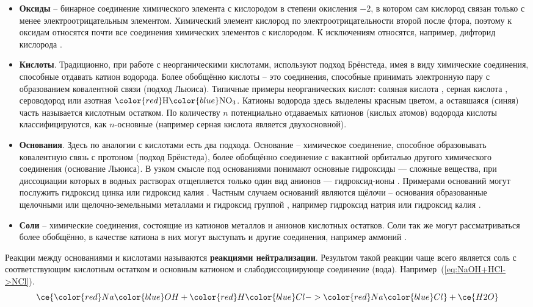 \begin{itemize}
    \item \textbf{Оксиды} --  бинарное соединение химического элемента с кислородом в степени окисления $-2$, в котором сам кислород связан только с менее электроотрицательным элементом. Химический элемент кислород по электроотрицательности второй после фтора, поэтому к оксидам относятся почти все соединения химических элементов с кислородом. К исключениям относятся, например, дифторид кислорода .
    \item \textbf{Кислоты}. Традиционно, при работе с неорганическими кислотами, используют подход Брёнстеда, имея в виду химические соединения, способные отдавать катион водорода. Более обобщённо кислоты -- это соединения, способные принимать электронную пару с образованием ковалентной связи (подход Льюиса). Типичные примеры неорганических кислот: соляная кислота , серная кислота , сероводород  или азотная $\color{red}\mathrm{H}\color{blue}\mathrm{NO}_{3}$. Катионы водорода здесь выделены красным цветом, а оставшаяся (синяя) часть называется кислотным остатком. По количеству $n$ потенциально отдаваемых катионов (кислых атомов) водорода кислоты классифицируются, как $n$-основные (например серная кислота является двухосновной). 
    \item \textbf{Основания}. Здесь по аналогии с кислотами есть два подхода. Основание -- химическое соединение, способное образовывать ковалентную связь с протоном (подход Брёнстеда), более обобщённо соединение с вакантной орбиталью другого химического соединения (основание Льюиса). В узком смысле под основаниями понимают основные гидроксиды — сложные вещества, при диссоциации которых в водных растворах отщепляется только один вид анионов — гидроксид-ионы . Примерами оснований могут послужить гидроксид цинка  или гидроксид калия . Частным случаем оснований являются щёлочи -- основания образованные щелочными или щелочно-земельными металлами и гидроксид группой , например гидроксид натрия  или гидроксид калия .
    \item \textbf{Соли} -- химические соединения, состоящие из катионов металлов и анионов кислотных остатков. Соли так же могут рассматриваться более обобщённо, в качестве катиона в них могут выступать и другие соединения, например аммоний .
\end{itemize}
Реакции между основаниями и кислотами называются \textbf{реакциями нейтрализации}. Результом такой реакции чаще всего является соль с соответствующим кислотным остатком и основным катионом и слабодиссоциирующе соединение (вода). Например~(\ref{eq:NaOH+HCl->NCl}).
\begin{equation}
\label{eq:NaOH+HCl->NCl}
    \ce{\color{red}Na\color{blue}OH  + \color{red}H\color{blue}Cl -> \color{red}Na\color{blue}Cl}  + \ce{H2O}
\end{equation}

